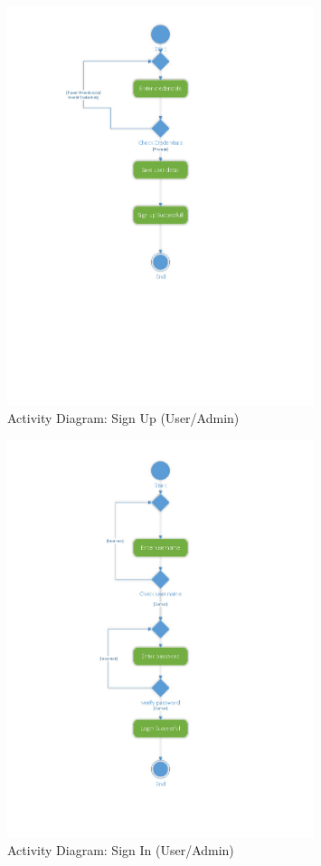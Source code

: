 \documentclass[12pt]{report}
\begin{document}
\begin{figure}[ht]
    \centering
    \includegraphics[width=0.8\textwidth]{Media/Binder2.pdf_Page_06.jpg} %
    \caption{Activity Diagram: Sign Up (User/Admin)}
    \label{fig:drawing1}
\end{figure}

\begin{figure}[ht]
    \centering
    \includegraphics[width=0.8\textwidth]{Media/Binder2.pdf_Page_07.jpg} %
    \caption{Activity Diagram: Sign In (User/Admin)}
    \label{fig:drawing1}
\end{figure}
\end{document}
